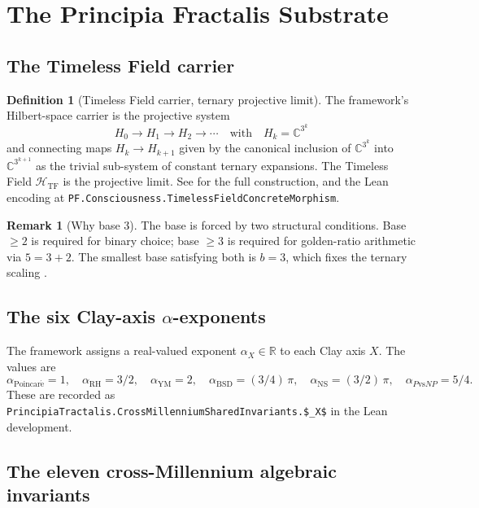 \documentclass[11pt,a4paper]{article}
\theoremstyle{plain}
\theoremstyle{definition}
\newtheorem{definition}[theorem]{Definition}
\newtheorem{remark}[theorem]{Remark}
\begin{document}
\section{The Principia Fractalis Substrate}
\label{sec:substrate}

\subsection{The Timeless Field carrier}

\begin{definition}[Timeless Field carrier, ternary projective limit]
The framework's Hilbert-space carrier is the projective system
\[
H_{0} \to H_{1} \to H_{2} \to \cdots
\quad\text{with}\quad
H_{k} = \mathbb{C}^{3^{k}}
\]
and connecting maps $H_{k} \to H_{k+1}$ given by the canonical
inclusion of $\mathbb{C}^{3^{k}}$ into $\mathbb{C}^{3^{k+1}}$ as the
trivial sub-system of constant ternary expansions. The Timeless
Field $\mathcal{H}_{\mathrm{TF}}$ is the projective limit. See
\cite[Ch.~4]{principia_book_v2} for the full construction, and the
Lean encoding at \texttt{PF.Consciousness.TimelessFieldConcreteMorphism}.
\end{definition}

\begin{remark}[Why base 3]
The base is forced by two structural conditions. Base $\ge 2$ is
required for binary choice; base $\ge 3$ is required for golden-ratio
arithmetic via $5 = 3 + 2$. The smallest base satisfying both is
$b = 3$, which fixes the ternary scaling
\cite[\S4.2]{principia_book_v2}.
\end{remark}

\subsection{The six Clay-axis $\alpha$-exponents}

The framework assigns a real-valued exponent $\alpha_{X} \in \mathbb{R}$
to each Clay axis $X$. The values are
\[
\alpha_{\mathrm{Poincar\acute e}} = 1, \quad
\alpha_{\mathrm{RH}} = 3/2, \quad
\alpha_{\mathrm{YM}} = 2, \quad
\alpha_{\mathrm{BSD}} = (3/4)\,\pi, \quad
\alpha_{\mathrm{NS}} = (3/2)\,\pi, \quad
\alpha_{P\mathrm{vs}NP} = 5/4.
\]
These are recorded as
\texttt{PrincipiaTractalis.CrossMillenniumSharedInvariants.\$\alpha\_X\$}
in the Lean development.

\subsection{The eleven cross-Millennium algebraic invariants}
\end{document}
